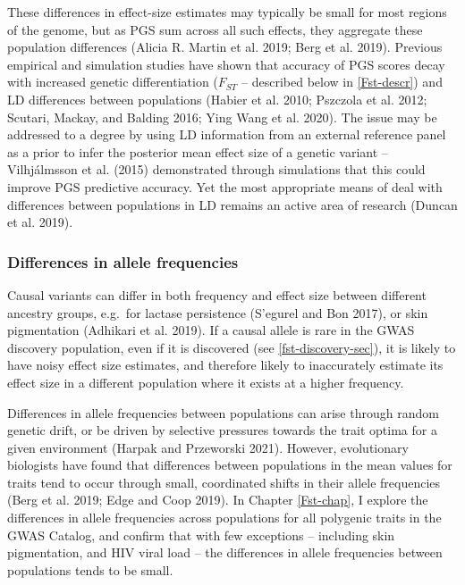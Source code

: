 \documentclass[
]{book}
\begin{document}
These differences in effect-size estimates may typically be small for most regions of the genome, but as PGS sum across all such effects, they aggregate these population differences (Alicia R. Martin et al. 2019; Berg et al. 2019). Previous empirical and simulation studies have shown that accuracy of PGS scores decay with increased genetic differentiation (\(F_{ST}\) -- described below in \ref{Fst-descr}) and LD differences between populations (Habier et al. 2010; Pszczola et al. 2012; Scutari, Mackay, and Balding 2016; Ying Wang et al. 2020). The issue may be addressed to a degree by using LD information from an external reference panel as a prior to infer the posterior mean effect size of a genetic variant -- Vilhjálmsson et al. (2015) demonstrated through simulations that this could improve PGS predictive accuracy. Yet the most appropriate means of deal with differences between populations in LD remains an active area of research (Duncan et al. 2019).

\hypertarget{differences-in-allele-frequencies}{%
\subsubsection{Differences in allele frequencies}\label{differences-in-allele-frequencies}}

Causal variants can differ in both frequency and effect size between different ancestry groups, e.g.~for lactase persistence (S'egurel and Bon 2017), or skin pigmentation (Adhikari et al. 2019). If a causal allele is rare in the GWAS discovery population, even if it is discovered (see \ref{fst-discovery-sec}), it is likely to have noisy effect size estimates, and therefore likely to inaccurately estimate its effect size in a different population where it exists at a higher frequency.

Differences in allele frequencies between populations can arise through random genetic drift, or be driven by selective pressures towards the trait optima for a given environment (Harpak and Przeworski 2021). However, evolutionary biologists have found that differences between populations in the mean values for traits tend to occur through small, coordinated shifts in their allele frequencies (Berg et al. 2019; Edge and Coop 2019). In Chapter \ref{Fst-chap}, I explore the differences in allele frequencies across populations for all polygenic traits in the GWAS Catalog, and confirm that with few exceptions -- including skin pigmentation, and HIV viral load -- the differences in allele frequencies between populations tends to be small.
\end{document}
